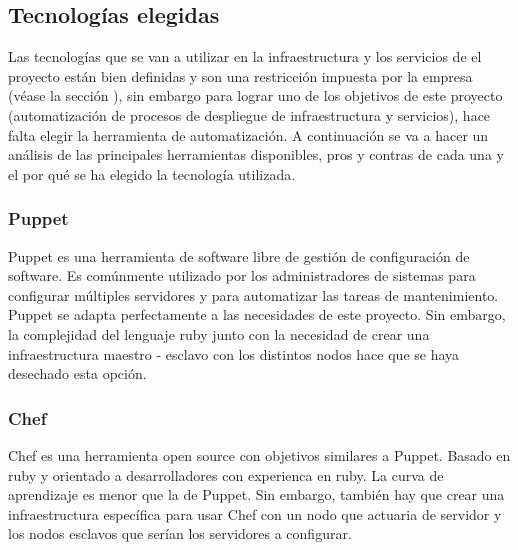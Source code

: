 	\subsection{Tecnologías elegidas}
	\label{tecnologias_elegidas}
		\begin{text}
			Las tecnologías que se van a utilizar en la infraestructura y los servicios de el proyecto están bien definidas y son una restricción impuesta por la empresa (véase la sección ), sin embargo para lograr uno de los objetivos de este proyecto (automatización de procesos de despliegue de infraestructura y servicios), hace falta elegir la herramienta de automatización. A continuación se va a hacer un análisis de las principales herramientas disponibles, pros y contras de cada una y el por qué se ha elegido la tecnología utilizada. \cite{comparadorAnsibleChefPuppet:online}
		\end{text}
	\subsubsection{Puppet}
		\begin{text}
			Puppet es una herramienta de software libre de gestión de configuración de software. Es comúnmente utilizado por los administradores de sistemas para configurar múltiples servidores y para automatizar las tareas de mantenimiento. Puppet se adapta perfectamente a las necesidades de este proyecto. Sin embargo, la complejidad del lenguaje ruby junto con la necesidad de crear una infraestructura maestro - esclavo con los distintos nodos hace que se haya desechado esta opción. \cite{puppet:online}
		\end{text}
		\clearpage
	\subsubsection{Chef}
		\begin{text}
			Chef es una herramienta open source con objetivos similares a Puppet. Basado en ruby y orientado a desarrolladores con experienca en ruby. La curva de aprendizaje es menor que la de Puppet. Sin embargo, también hay que crear una infraestructura específica para usar Chef con un nodo que actuaria de servidor y los nodos esclavos que serían los servidores a configurar. \cite{chef:online}
		\end{text}
